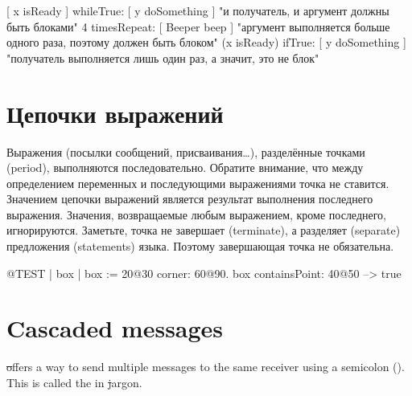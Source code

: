 \documentclass[a4paper,10pt,twoside]{book}
\begin{document}
{\begin{code}{}
[ x isReady ] whileTrue: [ y doSomething ]   "и получатель, и аргумент должны быть блоками"
4 timesRepeat: [ Beeper beep ]                   "аргумент выполняется больше одного раза, поэтому должен быть блоком"
(x isReady) ifTrue: [ y doSomething ]           "получатель выполняется лишь один раз, а значит, это не блок"
\end{code}

\section{Цепочки выражений}
Выражения (\ie посылки сообщений, присваивания\dots), разделённые точками (period), выполняются последовательно.
Обратите внимание, что между определением переменных и последующими выражениями точка не ставится.
Значением цепочки выражений является результат выполнения последнего выражения. Значения, возвращаемые
любым выражением, кроме последнего, игнорируются. Заметьте, точка не завершает (terminate), а разделяет (separate) предложения (statements) языка. Поэтому завершающая точка не обязательна.

\begin{code}{@TEST}
| box |
box := 20@30 corner: 60@90.
box containsPoint: 40@50 --> true
\end{code}

\section{Cascaded messages}
\st offers a way to send multiple messages to the same receiver using a semicolon (\ct{;}). This is called the  in \st jargon.


}
\end{document}
